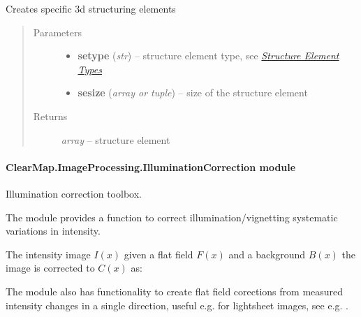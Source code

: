 \documentclass[letterpaper,10pt,english]{sphinxmanual}
\begin{document}

\begin{fulllineitems}
\label{api/ClearMap.ImageProcessing.Filter:ClearMap.ImageProcessing.Filter.StructureElement.structureElement3D}
Creates specific 3d structuring elements
\begin{quote}\begin{description}
\item[{Parameters}] \leavevmode\begin{itemize}
\item {} 
\textbf{setype} (\emph{str}) --
structure element type, see {\hyperref[api/ClearMap.ImageProcessing.Filter:structureelementtypes]{\emph{Structure Element Types}}}

\item {} 
\textbf{sesize} (\emph{array or tuple}) --
size of the structure element

\end{itemize}

\item[{Returns}] \leavevmode
\emph{array} --
structure element

\end{description}\end{quote}

\end{fulllineitems}



\paragraph{ClearMap.ImageProcessing.IlluminationCorrection module}
\label{api/ClearMap.ImageProcessing:clearmap-imageprocessing-illuminationcorrection-module}\label{api/ClearMap.ImageProcessing:module-ClearMap.ImageProcessing.IlluminationCorrection}
Illumination correction toolbox.

The module provides a function to correct illumination/vignetting systematic
variations in intensity.

The intensity image $I(x)$ given a flat field $F(x)$ and
a background $B(x)$ the image is corrected to $C(x)$ as:

The module also has functionality to create flat field corections from measured
intensity changes in a single direction, useful e.g. for lightsheet images,
see e.g. {\hyperref[api/ClearMap.ImageProcessing:ClearMap.ImageProcessing.IlluminationCorrection.flatfieldLineFromRegression]{\emph{}}}.
\end{document}
